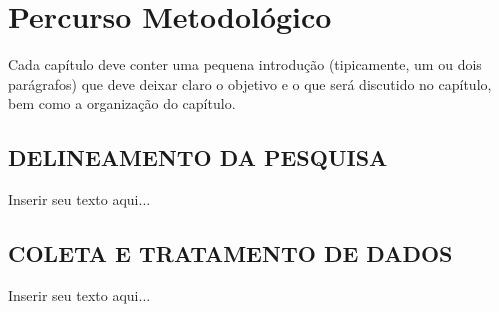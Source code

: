 
\chapter{\larger Percurso Metodológico}
\label{chap:metodologia}
Cada capítulo deve conter uma pequena introdução (tipicamente, um ou dois parágrafos) que deve deixar claro o objetivo e o que será discutido no capítulo, bem como a organização do capítulo.

\section{DELINEAMENTO DA PESQUISA}
\label{sec:titSecDelPesq}

Inserir seu texto aqui...

\section{COLETA E TRATAMENTO DE DADOS}
\label{sec:titSecColDad}

Inserir seu texto aqui...
